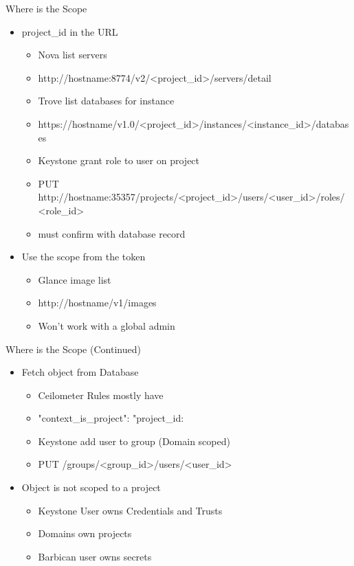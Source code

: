 \documentclass{beamer}
\begin{document}
\begin{frame}{Where is the Scope}
  \begin{itemize}

  \item project\_id in the URL
    \begin{itemize}
    \item Nova list servers
    \item http://hostname:8774/v2/<project\_id>/servers/detail
    \item Trove list databases for instance
    \item https://hostname/v1.0/<project\_id>/instances/<instance\_id>/databases
    \item Keystone grant role to user on project
    \item PUT http://hostname:35357/projects/<project\_id>/users/<user\_id>/roles/<role\_id>
    \item must confirm with database record
    \end{itemize}

  \item Use the scope from the token
    \begin{itemize}
    \item Glance image list
    \item http://hostname/v1/images
    \item Won't work with a global admin
    \end{itemize}
  \end{itemize}
\end{frame}

\begin{frame}{Where is the Scope (Continued)}
  \begin{itemize}

    
  \item Fetch object from Database
    \begin{itemize}
    \item Ceilometer Rules mostly have
    \item "context\_is\_project": "project\_id:%
    \item Keystone add user to group (Domain scoped)
    \item PUT /groups/<group\_id>/users/<user\_id>
    \end{itemize}

  \item Object is not scoped to a project
    \begin{itemize}
    \item Keystone User owns Credentials and Trusts
    \item Domains own projects
    \item Barbican user owns secrets
    \end{itemize}
  \end{itemize}
\end{frame}
\end{document}
